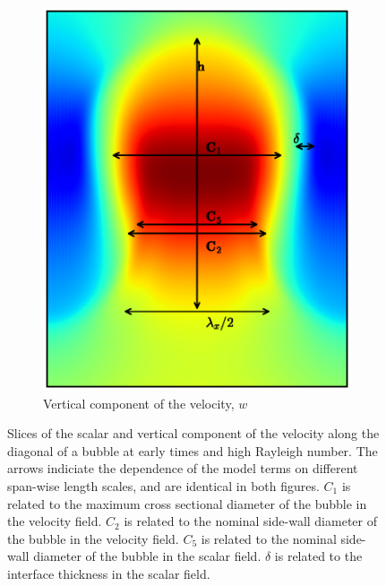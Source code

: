 \begin{figure}
\begin{subfigure}[b]{\columnwidth}
\includegraphics[width=\columnwidth]{figs/slice_w}
\caption{Vertical component of the velocity, $w$}
\end{subfigure}
\caption{
Slices of the scalar and vertical component of the velocity along the diagonal of a bubble at early times and high Rayleigh number.
The arrows indiciate the dependence of the model terms on different span-wise length scales, and are identical in both figures.
$C_1$ is related to the maximum cross sectional diameter of the bubble in the velocity field.
$C_2$ is related to the nominal side-wall diameter of the bubble in the velocity field.
$C_5$ is related to the nominal side-wall diameter of the bubble in the scalar field.
$\delta$ is related to the interface thickness in the scalar field.
}
\end{figure}

